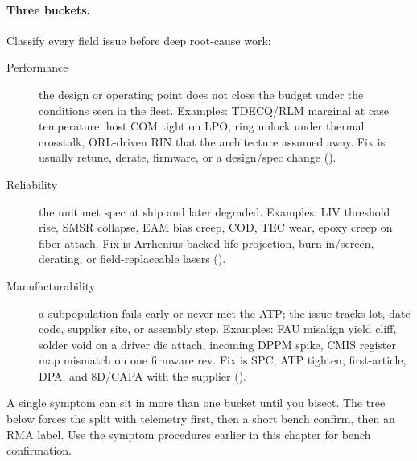 
\paragraph{Three buckets.}
Classify every field issue before deep root-cause work:

\begin{description}
\item[Performance] the design or operating point does not close the budget under
      the conditions seen in the fleet. Examples: TDECQ/RLM marginal at case
      temperature, host COM tight on LPO, ring unlock under thermal crosstalk,
      ORL-driven RIN that the architecture assumed away. Fix is usually retune,
      derate, firmware, or a design/spec change ().
\item[Reliability] the unit met spec at ship and later degraded. Examples: LIV
      threshold rise, SMSR collapse, EAM bias creep, COD, TEC wear, epoxy creep on
      fiber attach. Fix is Arrhenius-backed life projection, burn-in/screen, derating,
      or field-replaceable lasers
      ().
\item[Manufacturability] a subpopulation fails early or never met the ATP; the
      issue tracks lot, date code, supplier site, or assembly step. Examples: FAU
      misalign yield cliff, solder void on a driver die attach, incoming DPPM spike,
      CMIS register map mismatch on one firmware rev. Fix is SPC, ATP tighten,
      first-article, DPA, and 8D/CAPA with the supplier
      ().
\end{description}

A single symptom can sit in more than one bucket until you bisect. The tree below
forces the split with telemetry first, then a short bench confirm, then an RMA
label. Use the symptom procedures earlier in this chapter for bench confirmation.

